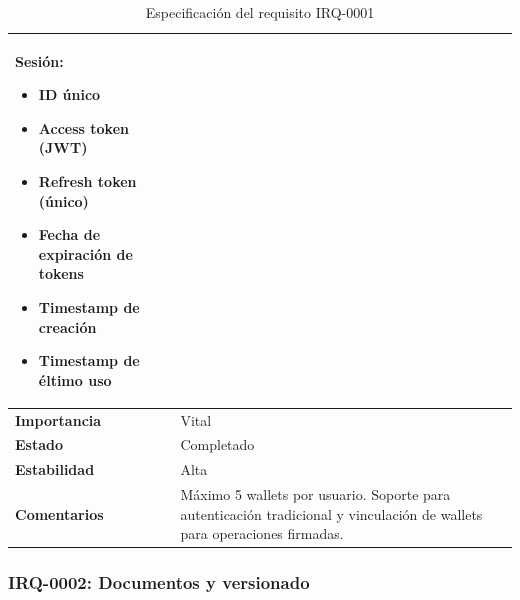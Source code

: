 \documentclass[11pt, a4paper]{article}
\begin{document}
\begin{table}[H]
\begin{tabular}{|p{4cm}|p{10cm}|}
    \textbf{Sesión:}
    \begin{itemize}
        \item ID único
        \item Access token (JWT)
        \item Refresh token (único)
        \item Fecha de expiración de tokens
        \item Timestamp de creación
        \item Timestamp de éltimo uso
    \end{itemize} \\
    \hline
    \textbf{Importancia} & Vital \\
    \hline
    \textbf{Estado} & Completado \\
    \hline
    \textbf{Estabilidad} & Alta \\
    \hline
    \textbf{Comentarios} & Máximo 5 wallets por usuario. Soporte para autenticación tradicional y vinculación de wallets para operaciones firmadas. \\
    \hline
    \end{tabular}
    \caption{Especificación del requisito IRQ-0001}
\end{table}

\subsubsection{IRQ-0002: Documentos y versionado}
\end{document}
